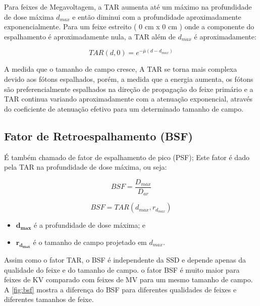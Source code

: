 \documentclass[11pt,a4paper]{article}
\newcounter{exemplo}
\begin{document}
	Para feixes de Megavoltagem, a TAR aumenta até um máximo na profundidade de dose máxima $d_{max}$ e então diminui com a profundidade aproximadamente exponencialmente. Para um feixe estreito ( 0 cm x 0 cm ) onde a componente do espalhamento é aproximadamente nula, a TAR além de $d_{max}$ é aproximadamente:
	
		\begin{equation}
			TAR(d, 0) = e^{-\bar{\mu} (d - d_{max})}
		\end{equation}

	A medida que o tamanho de campo cresce, A TAR se torna mais complexa devido aos fótons espalhados, porém, a medida que a energia aumenta, os fótons são preferencialmente espalhados na direção de propagação do feixe primário e a TAR continua variando aproximadamente com a atenuação exponencial, através do coeficiente de atenuação efetivo para um determinado tamanho de campo.

	\subsection{Fator de Retroespalhamento (BSF)}

	É também chamado de fator de espalhamento de pico (PSF); Este fator é dado pela TAR na profundidade de dose máxima, ou seja:

		\begin{equation}
			BSF = \frac{D_{max}}{D_{ar}}
		\end{equation}

		\begin{equation}
			BSF = TAR(d_{max}, r_{d_{max}})
		\end{equation}

	\begin{exemplo}[onde:]
		\begin{itemize}
			\item \textcolor{CarnationPink}{$\mathbf{d_{max}}$} é a profundidade de dose máxima; e
			\item \textcolor{CarnationPink}{$\mathbf{r_{d_{max}}}$} é o tamanho de campo projetado em $d_{max}$.
		\end{itemize}
	\end{exemplo}
	
	Assim como o fator TAR, o BSF é independente da SSD e depende apenas da qualidade do feixe e do tamanho de campo.  o fator BSF é muito maior para feixes de KV comparado com feixes de MV para um mesmo tamanho de campo. A \ref{fig:bsf} mostra a diferença do BSF para diferentes qualidades de feixes e diferentes tamanhos de feixe. 
\end{document}
